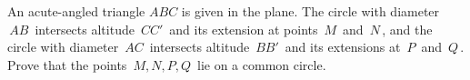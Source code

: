 An acute-angled triangle $ABC$ is given in the plane. The circle with diameter $\, AB \,$ intersects altitude $\, CC' \,$ and its extension at points $\, M \,$ and $\, N \,$,  and the circle with diameter $\, AC \,$ intersects altitude $\, BB' \,$ and its extensions at $\, P \,$ and $\, Q \,$. Prove that the points $\, M, N, P, Q \,$ lie on a common circle.